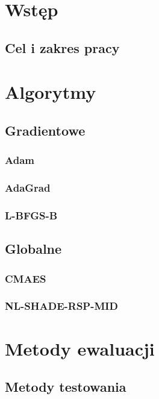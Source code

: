 \section{Wstęp}
    \subsection{Cel i zakres pracy}
        

\section{Algorytmy}
    \subsection{Gradientowe}
        \subsubsection*{Adam}
            
            
        \subsubsection*{AdaGrad} 
            

        \subsubsection*{L-BFGS-B}
            

    \subsection{Globalne}
        \subsubsection*{CMAES}
            

        \subsubsection*{NL-SHADE-RSP-MID}
            

\section{Metody ewaluacji}
    \subsection{Metody testowania}
        

